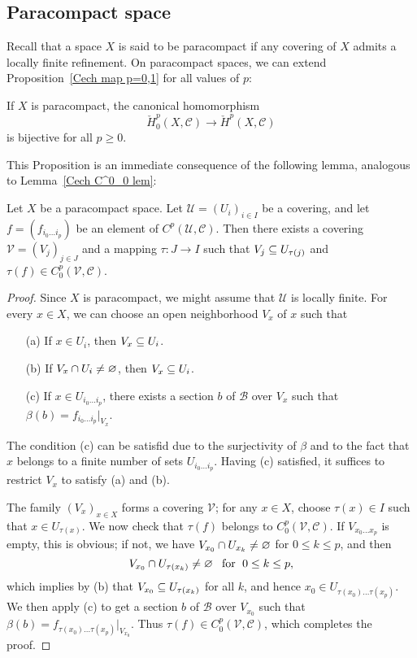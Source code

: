 \subsection{Paracompact space}
Recall that a space $X$ is said to be paracompact if any covering of $X$ admits a locally finite refinement. On paracompact spaces, we can extend Proposition~\ref{Cech map p=0,1} for all values of $p$:
\begin{theorem}\label{Cech paracompact thm}
If $X$ is paracompact, the canonical homomorphism
\[\check{H}^p_0(X,\mathscr{C})\to\check{H}^p(X,\mathscr{C})\]
is bijective for all $p\geq0$.
\end{theorem}
This Proposition is an immediate consequence of the following lemma, analogous to Lemma~\ref{Cech C^0_0 lem}:
\begin{lemma}
Let $X$ be a paracompact space. Let $\mathcal{U}=(U_i)_{i\in I}$ be a covering, and let $f=(f_{i_0\dots i_p})$ be an element of $C^p(\mathcal{U},\mathscr{C})$. Then there exists a covering $\mathcal{V}=(V_j)_{j\in J}$ and a mapping $\tau:J\to I$ such that $V_j\subseteq U_{\tau(j)}$ and $\tau(f)\in C_0^p(\mathcal{V},\mathscr{C})$.
\end{lemma}
\begin{proof}
Since $X$ is paracompact, we might assume that $\mathcal{U}$ is locally finite. For every $x\in X$, we can choose an open neighborhood $V_x$ of $x$ such that
\begin{itemize}
\item[(a)] If $x\in U_i$, then $V_x\subseteq U_i$.
\item[(b)] If $V_x\cap U_i\neq\varnothing$, then $V_x\subseteq U_i$.
\item[(c)] If $x\in U_{i_0\dots i_p}$, there exists a section $b$ of $\mathscr{B}$ over $V_x$ such that $\beta(b)=f_{i_0\dots i_p}|_{V_x}$.
\end{itemize}
The condition (c) can be satisfid due to the surjectivity of $\beta$ and to the fact that $x$ belongs to a finite number of sets $U_{i_0\dots i_p}$. Having (c) satisfied, it suffices to restrict $V_x$ to satisfy (a) and (b).\par
The family $(V_x)_{x\in X}$ forms a covering $\mathcal{V}$; for any $x\in X$, choose $\tau(x)\in I$ such that $x\in U_{\tau(x)}$. We now check that $\tau(f)$ belongs to $C^p_0(\mathcal{V},\mathscr{C})$. If $V_{x_0\dots x_p}$ is empty, this is obvious; if not, we have $V_{x_0}\cap U_{x_k}\neq\varnothing$ for $0\leq k\leq p$, and then
\[V_{x_0}\cap U_{\tau(x_k)}\neq\varnothing\hspace{8pt}\text{for}\hspace{6pt} 0\leq k\leq p,\] 
which implies by (b) that $V_{x_0}\subseteq U_{\tau(x_k)}$ for all $k$, and hence $x_0\in U_{\tau(x_0)\dots\tau(x_p)}$. We then apply (c) to get a section $b$ of $\mathscr{B}$ over $V_{x_0}$ such that $\beta(b)=f_{\tau(x_0)\dots\tau(x_p)}|_{V_{x_0}}$. Thus $\tau(f)\in C^p_0(\mathcal{V},\mathscr{C})$, which completes the proof.
\end{proof}
